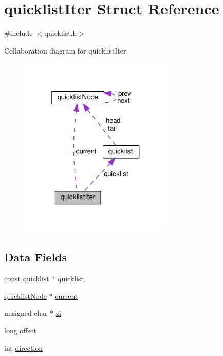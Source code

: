 \hypertarget{structquicklist_iter}{}\section{quicklist\+Iter Struct Reference}
\label{structquicklist_iter}


{\ttfamily \#include $<$quicklist.\+h$>$}



Collaboration diagram for quicklist\+Iter\+:
\nopagebreak
\begin{figure}[H]
\begin{center}
\leavevmode
\includegraphics[width=208pt]{structquicklist_iter__coll__graph}
\end{center}
\end{figure}
\subsection*{Data Fields}
\begin{DoxyCompactItemize}
\item 
const \hyperlink{structquicklist}{quicklist} $\ast$ \hyperlink{structquicklist_iter_a4aa33c2ba0681808fcf026725cfac512}{quicklist}
\item 
\hyperlink{structquicklist_node}{quicklist\+Node} $\ast$ \hyperlink{structquicklist_iter_a5e0e4458fdbf71c9a0683ac803fc70e6}{current}
\item 
unsigned char $\ast$ \hyperlink{structquicklist_iter_a14218c4c1ee05ec32cc12721f772f294}{zi}
\item 
long \hyperlink{structquicklist_iter_adcce6ee751c1469525aec834a4d37ea8}{offset}
\item 
int \hyperlink{structquicklist_iter_a886d551d5381dc3e53f17825ffc51641}{direction}
\end{DoxyCompactItemize}


